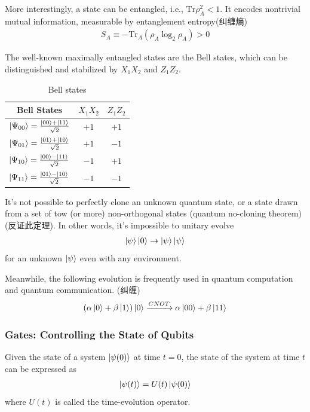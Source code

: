 More interestingly, a state can be entangled, i.e., $\mathrm{Tr}\rho_A^2<1$. It encodes nontrivial mutual information, measurable by entanglement entropy(纠缠熵)
\begin{align*}
    S_A\equiv -\mathrm{Tr}_A(\rho_A\log_2\rho_A)>0
\end{align*}

The well-known maximally entangled states are the Bell states, which can be distinguished and stabilized by $X_1X_2$ and $Z_1Z_2$. 

\begin{table}[!htb]
    \centering
    \caption{Bell states}
    \begin{tabular}[c]{ccc}\toprule
        Bell States & $X_1X_2$ & $Z_1Z_2$\\ \midrule
        $\ket{\Psi_{00}}=\frac{\ket{00}+\ket{11}}{\sqrt{2}}$ & $+1$ & $+1$ \\
        $\ket{\Psi_{01}}=\frac{\ket{01}+\ket{10}}{\sqrt{2}}$ & $+1$ & $-1$ \\
        $\ket{\Psi_{10}}=\frac{\ket{00}-\ket{11}}{\sqrt{2}}$ & $-1$ & $+1$ \\
        $\ket{\Psi_{11}}=\frac{\ket{01}-\ket{10}}{\sqrt{2}}$ & $-1$ & $-1$ 
        \\ \bottomrule
    \end{tabular}
\end{table}

It's not possible to perfectly clone an unknown quantum state, or a state drawn from a set of tow (or more) non-orthogonal states (quantum no-cloning theorem)(反证此定理). In other words, it's impossible to unitary evolve
\begin{align*}
    \ket{\psi}\ket{0}\rightarrow\ket{\psi}\ket{\psi}
\end{align*}
for an unknown $\ket{\psi}$ even with any environment. 

Meanwhile, the following evolution is frequently used in quantum computation and quantum communication. (纠缠)
\begin{align*}
    (\alpha\ket{0}+\beta\ket{1})\ket{0}\xrightarrow{CNOT} \alpha\ket{00}+\beta\ket{11}
\end{align*}

\subsubsection{Gates: Controlling the State of Qubits}
Given the state of a system $\ket{\psi(0)}$ at time $t=0$, the state of the system at time $t$ can be expressed as 
\begin{align*}
    \ket{\psi(t)}=U(t)\ket{\psi(0)}
\end{align*}
where $U(t)$ is called the time-evolution operator. 

